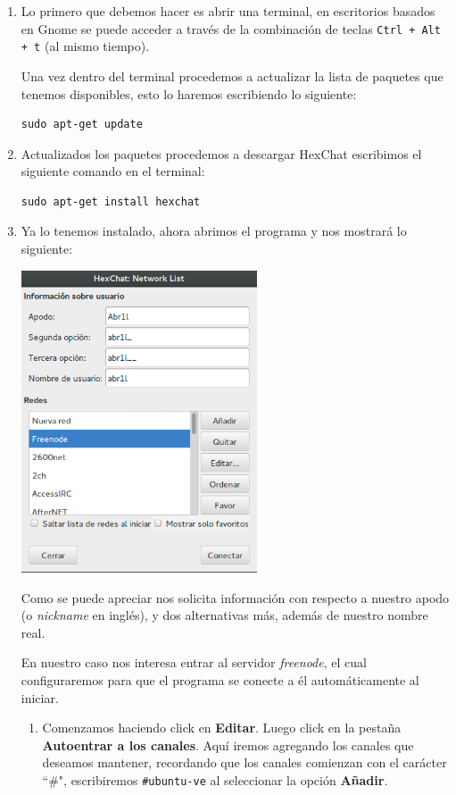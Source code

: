 \documentclass[12pt,letterpaper]{article}
\begin{document}
\begin{enumerate}
\item Lo primero que debemos hacer es abrir una terminal, en escritorios basados en Gnome se puede acceder a trav\'es  de la combinaci\'on de teclas \verb!Ctrl + Alt + t! (al mismo tiempo). 

Una vez dentro del terminal procedemos a actualizar la lista de paquetes que tenemos disponibles, esto lo haremos escribiendo lo siguiente:

\begin{verbatim}
sudo apt-get update
\end{verbatim}

\item Actualizados los paquetes procedemos a descargar HexChat escribimos el siguiente comando en el terminal:

\begin{verbatim}
sudo apt-get install hexchat
\end{verbatim}

\item Ya lo tenemos instalado, ahora abrimos el programa y nos mostrará lo siguiente:

\includegraphics[width = 7cm]{imagenes/imagen1.png}

Como se puede apreciar nos solicita información con respecto a nuestro apodo (o \textit{nickname} en inglés), y dos alternativas más, además de nuestro nombre real.

En nuestro caso nos interesa entrar al servidor \textit{freenode}, el cual configuraremos para que el programa se conecte a él automáticamente al iniciar.

\begin{enumerate}
\item Comenzamos haciendo click en \textbf{Editar}. Luego click en la pestaña \textbf{Autoentrar a los canales}. Aquí iremos agregando los canales que deseamos mantener, recordando que los canales comienzan con el carácter ``\#", escribiremos \texttt{\#ubuntu-ve} al seleccionar la opci\'on \textbf{A\~nadir}.


\end{enumerate}
\end{enumerate}
\end{document}
